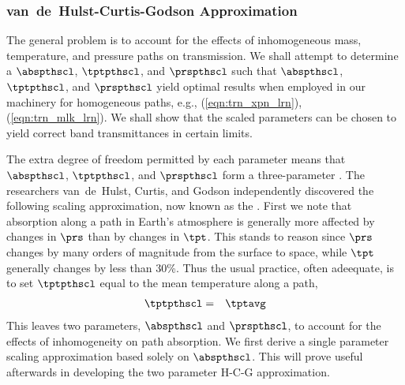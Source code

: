 \documentclass[12pt]{article}
\begin{document}
\subsubsection[H-C-G Approximation]{van~de~Hulst-Curtis-Godson Approximation}\label{sxn:HCG}
The general problem is to account for the effects of inhomogeneous
mass, temperature, and pressure paths on transmission.
We shall attempt to determine a 
$\abspthscl$,  $\tptpthscl$, and
 $\prspthscl$ such that $\abspthscl$, 
$\tptpthscl$, and $\prspthscl$ yield optimal results when employed
in our machinery for homogeneous paths, e.g.,
(\ref{eqn:trn_xpn_lrn}), (\ref{eqn:trn_mlk_lrn}). 
We shall show that the scaled parameters can be chosen 
to yield correct band transmittances in certain limits.

The extra degree of freedom permitted by each parameter means that 
$\abspthscl$, $\tptpthscl$, and $\prspthscl$ form a three-parameter 
.
The researchers van~de~Hulst, Curtis, and Godson independently
discovered the following scaling approximation, now known as the 
. 
First we note that absorption along a path in Earth's atmosphere
is generally more affected by changes in $\prs$ than by changes in
$\tpt$. 
This stands to reason since $\prs$ changes by many orders of magnitude
from the surface to space, while $\tpt$ generally changes by less than
30\%.
Thus the usual practice, often adeequate, is to set
$\tptpthscl$ equal to the mean temperature along a path, 
\begin{eqnarray}
\tptpthscl & = & \tptavg
\label{eqn:tpt_pth_scl_dfn}
\end{eqnarray}
This leaves two parameters, $\abspthscl$ and $\prspthscl$, to account for
the effects of inhomogeneity on path absorption.
We first derive a single parameter scaling approximation based solely
on $\abspthscl$. 
This will prove useful afterwards in developing the two parameter
H-C-G approximation.
\end{document}
